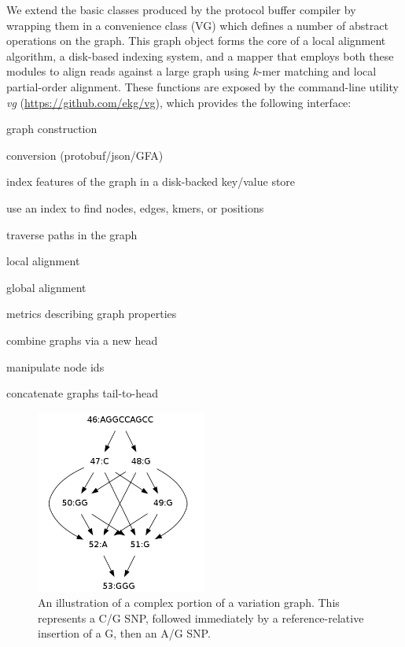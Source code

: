 \documentclass{article}
\begin{document}
We extend the basic classes produced by the protocol buffer compiler by wrapping them in a convenience class (VG) which defines a number of abstract operations on the graph. This graph object forms the core of a local alignment algorithm, a disk-based indexing system, and a mapper that employs both these modules to align reads against a large graph using $k$-mer matching and local partial-order alignment. These functions are exposed by the command-line utility \emph{vg} (\url{https://github.com/ekg/vg}), which provides the following interface:

\begin{description}  \itemsep1pt \parskip0pt 
  \item[ construct    ] graph construction
  \item[ view         ] conversion (protobuf/json/GFA)
  \item[ index        ] index features of the graph in a disk-backed key/value store
  \item[ find         ] use an index to find nodes, edges, kmers, or positions
  \item[ paths        ] traverse paths in the graph
  \item[ align        ] local alignment
  \item[ map          ] global alignment
  \item[ stats        ] metrics describing graph properties
  \item[ join         ] combine graphs via a new head
  \item[ ids          ] manipulate node ids
  \item[ concat       ] concatenate graphs tail-to-head
\end{description}

\begin{figure}[t]
\centering
\includegraphics[width=0.5\textwidth]{figures/complexjunction}
\caption{\label{fig:complexjunction}
  An illustration of a complex portion of a variation graph. This represents a C/G SNP, followed immediately by a reference-relative insertion of a G, then an A/G SNP.
}
\end{figure}
\end{document}
